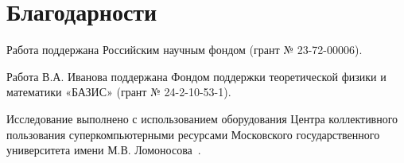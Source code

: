 \documentclass[aps,preprint,showpacs,aps,amsmath,showkeys,nobibnotes,nofootinbib,footnotes,superscriptaddress]{revtex4-2}
\begin{document}
\section*{Благодарности}


Работа поддержана Российским научным фондом (грант № 23-72-00006). %

Работа В.А. Иванова поддержана Фондом поддержки теоретической физики и математики «БАЗИС» (грант № 24-2-10-53-1).

Исследование выполнено с использованием оборудования Центра коллективного пользования суперкомпьютерными ресурсами Московского государственного университета имени М.В. Ломоносова~\cite{SC}.
	
\end{document}
